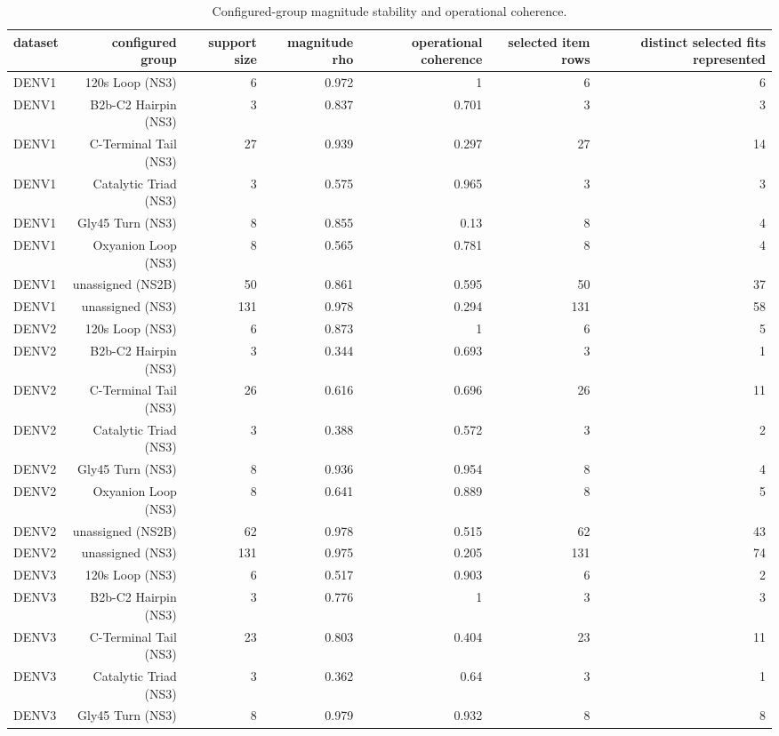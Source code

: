 \begin{table}[t]
  \centering
  \caption{Configured-group magnitude stability and operational coherence.}
  \label{tab:configured_group}
  \begin{tabular}{lrrrrrr}
    \toprule
    dataset & configured group & support size & magnitude rho & operational coherence & selected item rows & distinct selected fits represented \\
    \midrule
    DENV1 & 120s Loop (NS3) & 6 & 0.972 & 1 & 6 & 6 \\
    DENV1 & B2b-C2 Hairpin (NS3) & 3 & 0.837 & 0.701 & 3 & 3 \\
    DENV1 & C-Terminal Tail (NS3) & 27 & 0.939 & 0.297 & 27 & 14 \\
    DENV1 & Catalytic Triad (NS3) & 3 & 0.575 & 0.965 & 3 & 3 \\
    DENV1 & Gly45 Turn (NS3) & 8 & 0.855 & 0.13 & 8 & 4 \\
    DENV1 & Oxyanion Loop (NS3) & 8 & 0.565 & 0.781 & 8 & 4 \\
    DENV1 & unassigned (NS2B) & 50 & 0.861 & 0.595 & 50 & 37 \\
    DENV1 & unassigned (NS3) & 131 & 0.978 & 0.294 & 131 & 58 \\
    DENV2 & 120s Loop (NS3) & 6 & 0.873 & 1 & 6 & 5 \\
    DENV2 & B2b-C2 Hairpin (NS3) & 3 & 0.344 & 0.693 & 3 & 1 \\
    DENV2 & C-Terminal Tail (NS3) & 26 & 0.616 & 0.696 & 26 & 11 \\
    DENV2 & Catalytic Triad (NS3) & 3 & 0.388 & 0.572 & 3 & 2 \\
    DENV2 & Gly45 Turn (NS3) & 8 & 0.936 & 0.954 & 8 & 4 \\
    DENV2 & Oxyanion Loop (NS3) & 8 & 0.641 & 0.889 & 8 & 5 \\
    DENV2 & unassigned (NS2B) & 62 & 0.978 & 0.515 & 62 & 43 \\
    DENV2 & unassigned (NS3) & 131 & 0.975 & 0.205 & 131 & 74 \\
    DENV3 & 120s Loop (NS3) & 6 & 0.517 & 0.903 & 6 & 2 \\
    DENV3 & B2b-C2 Hairpin (NS3) & 3 & 0.776 & 1 & 3 & 3 \\
    DENV3 & C-Terminal Tail (NS3) & 23 & 0.803 & 0.404 & 23 & 11 \\
    DENV3 & Catalytic Triad (NS3) & 3 & 0.362 & 0.64 & 3 & 1 \\
    DENV3 & Gly45 Turn (NS3) & 8 & 0.979 & 0.932 & 8 & 8 \\

\end{tabular}
\end{table}
